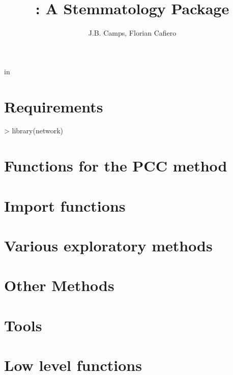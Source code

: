 \documentclass[article,nojss]{jss}
\author{J.B. Camps, Florian Cafiero}
\title{\pkg{stemmatology}: A \proglang{R} Stemmatology Package}
\begin{document}
\renewenvironment{Schunk}{}{}




\maketitle

 in 

\section*{Requirements}

\begin{Schunk}
\begin{Sinput}
> library(network)
\end{Sinput}
\end{Schunk}


\section{Functions for the PCC method}



\section{Import functions}

\section{Various exploratory methods}

\section{Other Methods}

\section{Tools}

\section{Low level functions}
\end{document}
